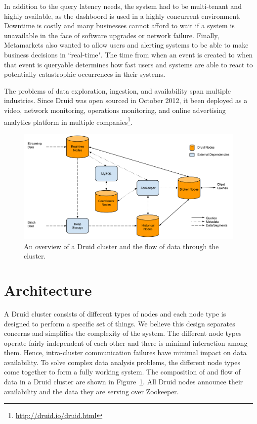 \documentclass{vldb}
\begin{document}
In addition to the query latency needs, the system had to be multi-tenant and
highly available, as the dashboord is used in a highly concurrent environment.
Downtime is costly and many businesses cannot afford to wait if a system is
unavailable in the face of software upgrades or network failure. Finally,
Metamarkets also wanted to allow users and alerting systems to be able to make
business decisions in ``real-time". The time from when an event is created to
when that event is queryable determines how fast users and systems are able to
react to potentially catastrophic occurrences in their systems. 

The problems of data exploration, ingestion, and availability span multiple
industries. Since Druid was open sourced in October 2012, it been deployed as a
video, network monitoring, operations monitoring, and online advertising
analytics platform in multiple companies\footnote{\href{http://druid.io/druid.html}{http://druid.io/druid.html}}.

\begin{figure}
\centering
\includegraphics[width = 4.5in]{cluster}
\caption{An overview of a Druid cluster and the flow of data through the cluster.}
\label{fig:cluster}
\end{figure}

\section{Architecture}
A Druid cluster consists of different types of nodes and each node type is
designed to perform a specific set of things. We believe this design separates
concerns and simplifies the complexity of the system. The different node types
operate fairly independent of each other and there is minimal interaction among
them. Hence, intra-cluster communication failures have minimal impact on data
availability.  To solve complex data analysis problems, the different node
types come together to form a fully working system. The composition of and flow
of data in a Druid cluster are shown in Figure~\ref{fig:cluster}. All Druid
nodes announce their availability and the data they are serving over
Zookeeper\cite{hunt2010zookeeper}.
\end{document}
